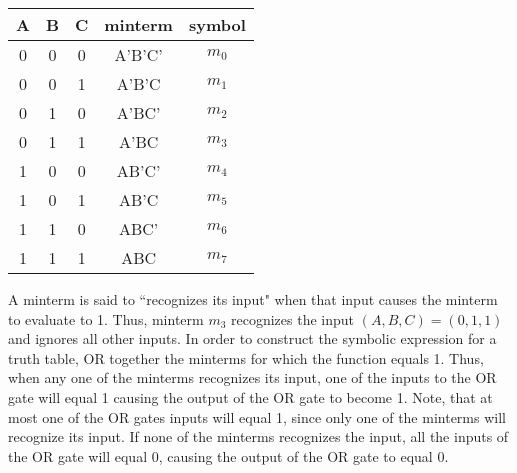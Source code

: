 \begin{tabular}{c|c|c||c|c}
A & B & C & minterm & symbol	\\ \hline
0 & 0 & 0 & A'B'C'  & $m_0$	\\ \hline
0 & 0 & 1 & A'B'C   & $m_1$	\\ \hline
0 & 1 & 0 & A'BC'   & $m_2$	\\ \hline
0 & 1 & 1 & A'BC    & $m_3$	\\ \hline
1 & 0 & 0 & AB'C'   & $m_4$	\\ \hline
1 & 0 & 1 & AB'C    & $m_5$	\\ \hline
1 & 1 & 0 & ABC'    & $m_6$	\\ \hline
1 & 1 & 1 & ABC     & $m_7$	\\ 
\end{tabular}

A minterm is said to ``recognizes its input" when that input
causes the minterm to evaluate to 1.  Thus, minterm $m_3$ recognizes
the input $(A,B,C)=(0,1,1)$ and ignores all other inputs.  In order 
to construct the symbolic expression for a truth table, OR together 
the minterms for which the function equals 1. Thus, when any one of 
the minterms recognizes its input, one of the inputs to the OR gate 
will equal 1 causing the output of the OR gate to become 1.  Note, 
that at most one of the OR gates inputs will equal 1, since only one 
of the minterms will recognize its input.  If none of the minterms 
recognizes the input, all the inputs of the OR gate will equal 0, 
causing the output of the OR gate to equal 0.  

